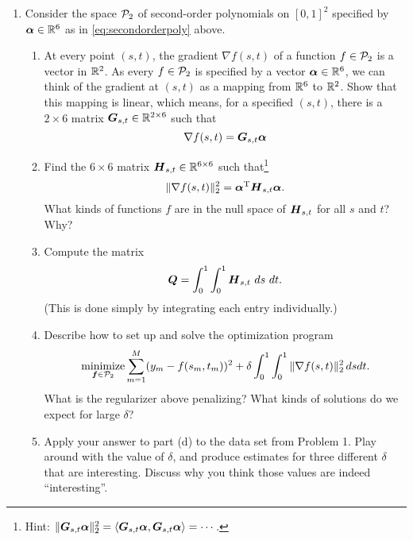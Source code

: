 \documentclass[11pt]{article}
\begin{document}
\begin{enumerate}
\vspace{4mm} 
\item Consider the space $\mathcal{P}_2$ of  second-order polynomials on $[0,1]^2$ specified by $\boldsymbol{\alpha}\in\mathbb{R}^6$ as in \eqref{eq:secondorderpoly} above.
\begin{enumerate}

	\item At every point $(s,t)$, the gradient $\nabla f(s,t)$ of a function $f \in \mathcal{P}_2$  is a vector in $\mathbb{R}^2$.  As every $f \in \mathcal{P}_2$ is specified by a vector $\boldsymbol{\alpha}\in\mathbb{R}^6$, we can think of the gradient at $(s,t)$ as a mapping from $\mathbb{R}^6$ to $\mathbb{R}^2$.  Show that this mapping is linear, which means, for a specified $(s,t)$, there is a $2\times 6$ matrix $\boldsymbol{G}_{s,t} \in \mathbb{R}^{2 \times 6}$ such that
	\[
		\nabla f(s,t) = \boldsymbol{G}_{s,t}\boldsymbol{\alpha}
	\]
	
	\item Find the $6\times 6$ matrix $\boldsymbol{H}_{s,t} \in \mathbb{R}^{6 \times 6}$ such that\footnote{Hint: $\|\boldsymbol{G}_{s,t}\boldsymbol{\alpha}\|_2^2 = \langle\boldsymbol{G}_{s,t}\boldsymbol{\alpha},\boldsymbol{G}_{s,t}\boldsymbol{\alpha}\rangle = \cdots$.}
	\[
		\|\nabla f(s,t)\|_2^2 = \boldsymbol{\alpha}^{\mathrm{T}} \boldsymbol{H}_{s,t}\boldsymbol{\alpha}.
	\]
	What kinds of functions $f$ are in the null space of $\boldsymbol{H}_{s,t}$ for all $s$ and $t$?  Why?
	
	\item Compute the matrix 
	\[
		\boldsymbol{Q} = \int_{0}^1\int_0^1 \boldsymbol{H}_{s,t} \ ds \ dt.
	\]
	(This is done simply by integrating each entry individually.)
	
	\item Describe how to set up and solve the optimization program
	\[
		\operatorname*{\text{minimize}}_{\boldsymbol{f}\in\mathcal{P}_2}\sum_{m=1}^M(y_m - f(s_m,t_m))^2 + \delta \int_0^1\int_0^1\|\nabla f(s,t)\|_2^2\,dsdt.
	\]
	What is the regularizer above penalizing?  What kinds of solutions do we expect for large $\delta$?
	
	\item Apply your answer to part (d) to the data set from Problem 1.  Play around with the value of $\delta$, and produce estimates for three different $\delta$ that are interesting.  Discuss why you think those values are indeed ``interesting''.
\end{enumerate}



















\end{enumerate}
\end{document}
